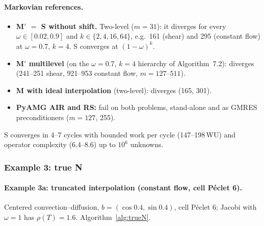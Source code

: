 \paragraph{Markovian references.}
\begin{itemize}
  \item \textbf{M$'$ $=$ S without shift.} Two-level ($m=31$): it diverges for every $\omega\in[0.02,0.9]$ and
    $k\in\{2,4,16,64\}$, e.g.\ 161 (shear) and 295 (constant flow) at $\omega=0.7$, $k=4$. S converges at
    $(1-\omega)^k$.
  \item \textbf{M$'$ multilevel} (on the $\omega=0.7$, $k=4$ hierarchy of Algorithm~7.2): diverges (241--251 shear,
    921--953 constant flow, $m=127$--$511$).
  \item \textbf{M with ideal interpolation} (two-level): diverges (165, 301).
  \item \textbf{PyAMG AIR and RS:} fail on both problems, stand-alone and as GMRES preconditioners ($m=127$, 255).
\end{itemize}
S converges in 4--7 cycles with bounded work per cycle (147--198\,WU) and operator complexity (6.4--8.6) up to $10^6$
unknowns.

\subsubsection{Example 3: true N}\label{sec:num-trueN}

\paragraph{Example 3a: truncated interpolation (constant flow, cell P\'eclet 6).}
Centered convection--diffusion, $b=(\cos0.4,\sin0.4)$, cell P\'eclet 6; Jacobi with $\omega=1$ has $\rho(T)=1.6$.
Algorithm~\ref{alg:trueN}.

\begin{table}[t]
\centering
\caption{Example 3a. N, its twin, MJ and MJF on the same hierarchy.}\label{tab:trueN-a}
\end{table}

